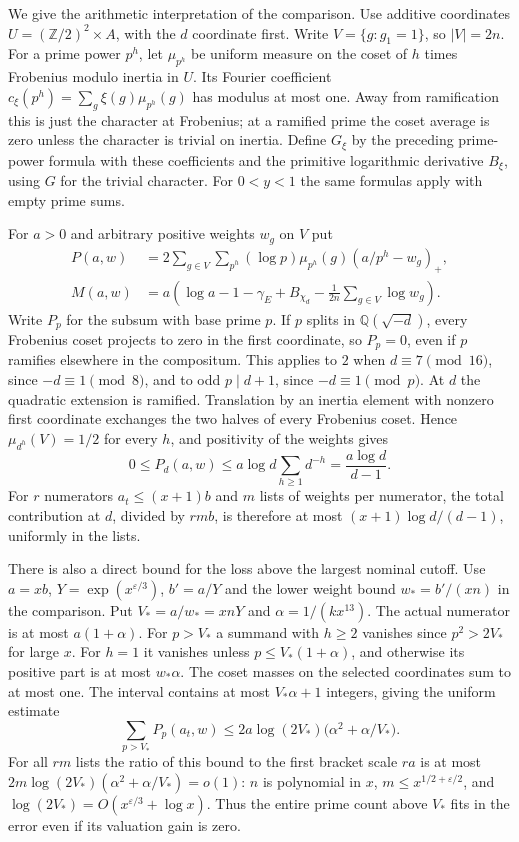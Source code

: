 \documentclass[11pt]{amsart}
\theoremstyle{definition}
\theoremstyle{remark}
\begin{document}
We give the arithmetic interpretation of the comparison. Use additive
coordinates $U=(\mathbb Z/2)^2\times A$, with the $d$ coordinate
first. Write $V=\{g:g_1=1\}$, so $|V|=2n$. For a prime power
$p^h$, let $\mu_{p^h}$ be uniform measure on the coset of $h$
times Frobenius modulo inertia in $U$. Its Fourier coefficient
$c_\xi(p^h)=\sum_g\xi(g)\mu_{p^h}(g)$ has modulus at most one.
Away from ramification this is just the character at Frobenius;
at a ramified prime the coset average is zero unless the character
is trivial on inertia. Define $G_\xi$ by the preceding prime-power
formula with these coefficients and the primitive logarithmic
derivative $B_\xi$, using $G$ for the trivial character. For $0<y<1$ the same
formulas apply with empty prime sums.

For $a>0$ and arbitrary positive weights $w_g$ on $V$ put
\[
 \begin{aligned}
 P(a,w)&=2\sum_{g\in V}\sum_{p^h}(\log p)\mu_{p^h}(g)
                        (a/p^h-w_g)_+,\\
 M(a,w)&=a\left(\log a-1-\gamma_E+B_{\chi_d}
                   -\frac1{2n}\sum_{g\in V}\log w_g\right).
 \end{aligned}
\]
Write $P_p$ for the subsum with base prime $p$. If $p$ splits in
$\mathbb Q(\sqrt{-d})$, every Frobenius coset projects to zero in
the first coordinate, so $P_p=0$, even if $p$ ramifies elsewhere in
the compositum. This applies to $2$ when $d\equiv7\pmod{16}$, since
$-d\equiv1\pmod8$, and to odd $p\mid d+1$, since $-d\equiv1\pmod p$.
At $d$ the quadratic extension is ramified. Translation by an inertia
element with nonzero first coordinate exchanges the two halves of
every Frobenius coset. Hence $\mu_{d^h}(V)=1/2$ for every $h$, and
positivity of the weights gives
\[
 0\le P_d(a,w)\le a\log d\sum_{h\ge1}d^{-h}
                 =\frac{a\log d}{d-1}.
\]
For $r$ numerators $a_t\le(x+1)b$ and $m$ lists of weights per
numerator, the total contribution at $d$, divided by $rmb$, is
therefore at most $(x+1)\log d/(d-1)$, uniformly in the lists.

There is also a direct bound for the loss above the largest
nominal cutoff. Use $a=xb$, $Y=\exp(x^{\varepsilon/3})$,
$b'=a/Y$ and the lower weight bound $w_*=b'/(xn)$ in the
comparison. Put $V_*=a/w_*=xnY$ and $\alpha=1/(kx^{13})$.
The actual numerator is at most $a(1+\alpha)$. For $p>V_*$ a
summand with $h\ge2$ vanishes since $p^2>2V_*$ for large $x$.
For $h=1$ it vanishes unless $p\le V_*(1+\alpha)$, and otherwise
its positive part is at most $w_*\alpha$. The coset masses on
the selected coordinates sum to at most one. The interval contains
at most $V_*\alpha+1$ integers, giving the uniform estimate
\[
 \sum_{p>V_*}P_p(a_t,w)
 \le 2a\log(2V_*)\big(\alpha^2+\alpha/V_*\big).
\]
For all $rm$ lists the ratio of this bound to the first bracket
scale $ra$ is at most $2m\log(2V_*)(\alpha^2+\alpha/V_*)=o(1)$:
$n$ is polynomial in $x$, $m\le x^{1/2+\varepsilon/2}$, and
$\log(2V_*)=O(x^{\varepsilon/3}+\log x)$. Thus the entire prime
count above $V_*$ fits in the error even if its valuation gain is zero.
\end{document}
